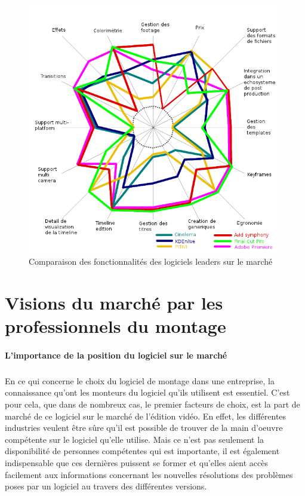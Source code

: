   \begin{figure}
      \begin{center}
        \includegraphics[width=0.98\textwidth]{images/spiderDiagramFeaturesComparision}
      \end{center}
      \caption{Comparaison des fonctionnalités des logiciels leaders sur le marché}
      \label{Yes}
  \end{figure}

\newpage
\section{Visions du marché par les professionnels du montage}

  \paragraph{L'importance de la position du logiciel sur le marché}

  \subparagraph{}
  En ce qui concerne le choix du logiciel de montage dans une entreprise,
  la connaissance qu'ont les monteurs du logiciel qu'ils utilisent est essentiel.
  C'est pour cela, que dans de nombreux cas, le premier facteurs de choix, est la part de marché de ce
  logiciel sur le marché de l'édition vidéo. En effet, les différentes industries veulent être sûre
  qu'il est possible de trouver de la main d'oeuvre compétente sur le logiciel qu'elle utilise.
  Mais ce n'est pas seulement la disponibilité de personnes compétentes qui est importante,
  il est également indispensable que ces dernières puissent se former et qu'elles aient
  accès facilement aux informations concernant les nouvelles résolutions des problèmes poses
  par un logiciel au travers des différentes versions.

